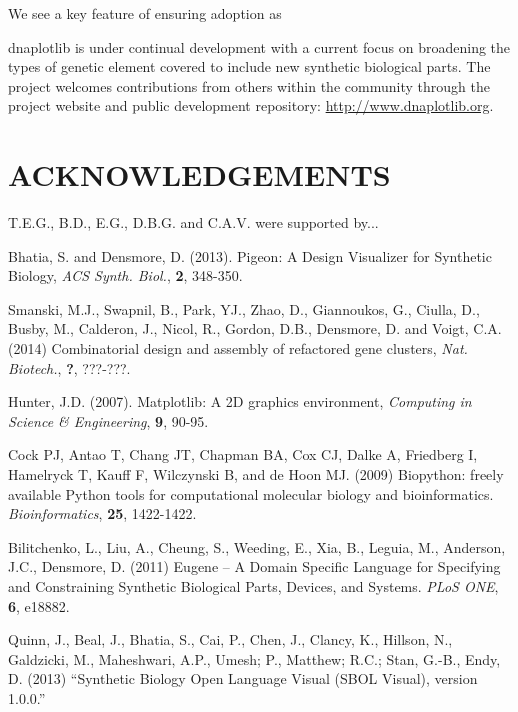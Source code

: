 \documentclass{bioinfo}
\begin{document}
We see a key feature of ensuring adoption as 

dnaplotlib is under continual development with a current focus on broadening the types of genetic element covered to include new synthetic biological parts. The project welcomes contributions from others within the community through the project website and public development repository: \href{http://www.dnaplotlib.org}{http://www.dnaplotlib.org}.

\section*{ACKNOWLEDGEMENTS}
T.E.G., B.D., E.G., D.B.G. and C.A.V. were supported by...

\begin{thebibliography}{}
	
 Bhatia, S. and Densmore, D. (2013). Pigeon: A Design Visualizer for Synthetic Biology, {\it ACS Synth. Biol.}, {\bf 2}, 348-350.

 Smanski, M.J., Swapnil, B., Park, YJ., Zhao, D., Giannoukos, G., Ciulla, D., Busby, M., Calderon, J., Nicol, R., Gordon, D.B., Densmore, D. and Voigt, C.A. (2014) Combinatorial design and assembly of refactored gene clusters, {\it Nat. Biotech.}, {\bf ?}, ???-???.

 Hunter, J.D. (2007). Matplotlib: A 2D graphics environment, {\it Computing in Science \& Engineering}, {\bf 9}, 90-95.

Cock PJ, Antao T, Chang JT, Chapman BA, Cox CJ, Dalke A, Friedberg I, Hamelryck T, Kauff F, Wilczynski B, and de Hoon MJ. (2009) Biopython: freely available Python tools for computational molecular biology and bioinformatics. {\it Bioinformatics}, {\bf 25}, 1422-1422.

Bilitchenko, L., Liu, A., Cheung, S., Weeding, E., Xia, B., Leguia, M., Anderson, J.C., Densmore, D. (2011) Eugene – A Domain Specific Language for Specifying and Constraining Synthetic Biological Parts, Devices, and Systems. {\it PLoS ONE}, {\bf 6}, e18882.

Quinn, J., Beal, J., Bhatia, S., Cai, P., Chen, J., Clancy, K., Hillson, N., Galdzicki, M., Maheshwari, A.P., Umesh; P., Matthew; R.C.; Stan, G.-B., Endy, D. (2013) ``Synthetic Biology Open Language Visual (SBOL Visual), version 1.0.0.''

\end{thebibliography}
\end{document}
